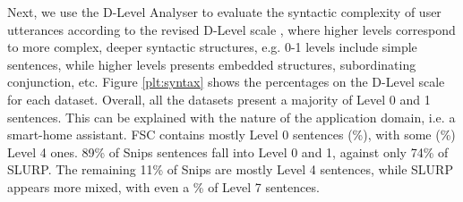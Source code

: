 \documentclass[11pt,a4paper]{article}
\newcommand{\datasetacr}{SLURP}
\begin{document}
 Next, we use the D-Level Analyser \cite{lu09:synt} to evaluate the syntactic complexity of user utterances according to the revised D-Level scale \cite{covington06:dlevel}, where higher levels correspond to more complex, deeper syntactic structures, e.g. 0-1 levels include simple sentences, while higher levels presents embedded structures, subordinating conjunction, etc. Figure \ref{plt:syntax} shows the percentages on the D-Level scale for each dataset. Overall, all the datasets present a majority of Level 0 and 1 sentences. This can be explained with the nature of the application domain, i.e. a smart-home assistant. FSC contains mostly Level 0 sentences (\%), with some (\%) Level 4 ones. 
89\% of Snips sentences fall into Level 0 and 1, against only 74\% of \datasetacr. The remaining 11\% of Snips are mostly Level 4 sentences, while \datasetacr{} appears more mixed, with even a \% of Level 7 sentences.
\end{document}
